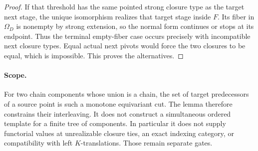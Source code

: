 \begin{proof}
If that threshold has the same pointed strong closure type
as the target next stage, the unique isomorphism realizes
that target stage inside $F$. Its fiber in $\Omega_D$ is
nonempty by strong extension, so the normal form continues
or stops at its endpoint. Thus the terminal empty-fiber
case occurs precisely with incompatible next closure types.
Equal actual next pivots would force the two closures to be
equal, which is impossible. This proves the alternatives.
\end{proof}

\paragraph{Scope.}
For two chain components whose union is a chain, the set of
target predecessors of a source point is such a monotone
equivariant cut. The lemma therefore constrains their
interleaving. It does not construct a simultaneous ordered
template for a finite tree of components. In particular it
does not supply functorial values at unrealizable closure
ties, an exact indexing category, or compatibility with left
$K$-translations. Those remain separate gates.
